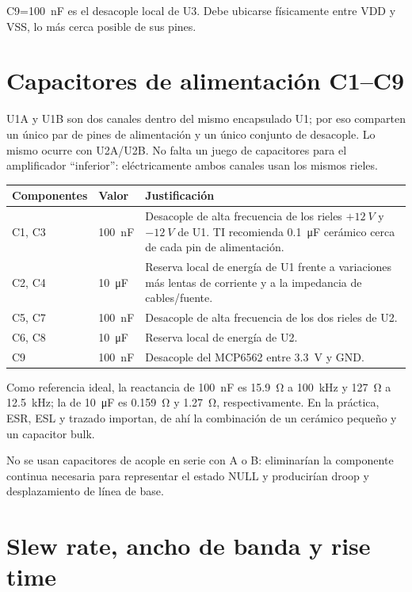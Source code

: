 \documentclass[11pt,a4paper]{article}
\begin{document}
C9=\SI{100}{\nano\farad} es el desacople local de U3. Debe ubicarse físicamente
entre VDD y VSS, lo más cerca posible de sus pines.

\section{Capacitores de alimentación C1--C9}

U1A y U1B son dos canales dentro del mismo encapsulado U1; por eso comparten un
único par de pines de alimentación y un único conjunto de desacople. Lo mismo
ocurre con U2A/U2B. No falta un juego de capacitores para el amplificador
``inferior'': eléctricamente ambos canales usan los mismos rieles.

\begin{longtable}{@{}p{30mm}p{25mm}p{105mm}@{}}
\toprule
Componentes & Valor & Justificación \\
\midrule
\endhead
C1, C3 & \SI{100}{\nano\farad} & Desacople de alta frecuencia de los rieles $+\SI{12}{V}$ y $-\SI{12}{V}$ de U1. TI recomienda \SI{0.1}{\micro\farad} cerámico cerca de cada pin de alimentación. \\
C2, C4 & \SI{10}{\micro\farad} & Reserva local de energía de U1 frente a variaciones más lentas de corriente y a la impedancia de cables/fuente. \\
C5, C7 & \SI{100}{\nano\farad} & Desacople de alta frecuencia de los dos rieles de U2. \\
C6, C8 & \SI{10}{\micro\farad} & Reserva local de energía de U2. \\
C9 & \SI{100}{\nano\farad} & Desacople del MCP6562 entre \SI{3.3}{V} y GND. \\
\bottomrule
\end{longtable}

Como referencia ideal, la reactancia de \SI{100}{\nano\farad} es
\SI{15.9}{\ohm} a \SI{100}{kHz} y \SI{127}{\ohm} a \SI{12.5}{kHz}; la de
\SI{10}{\micro\farad} es \SI{0.159}{\ohm} y \SI{1.27}{\ohm}, respectivamente.
En la práctica, ESR, ESL y trazado importan, de ahí la combinación de un
cerámico pequeño y un capacitor bulk.

No se usan capacitores de acople en serie con A o B: eliminarían la componente
continua necesaria para representar el estado NULL y producirían droop y
desplazamiento de línea de base.

\section{Slew rate, ancho de banda y rise time}
\end{document}
